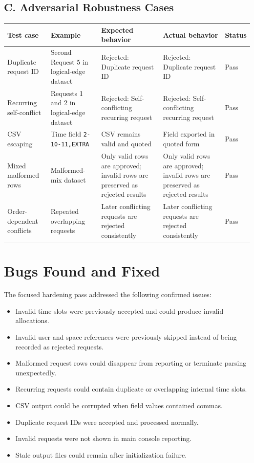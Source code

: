\documentclass[12pt,a4paper]{article}
\begin{document}
\subsection*{C. Adversarial Robustness Cases}
\begin{center}
\footnotesize
\begin{tabularx}{\textwidth}{@{} p{3.0cm} p{3.5cm} X X p{1.1cm} @{}}
\toprule
\textbf{Test case} & \textbf{Example} & \textbf{Expected behavior} & \textbf{Actual behavior} & \textbf{Status} \\
\midrule
Duplicate request ID & Second Request 5 in logical-edge dataset & Rejected: Duplicate request ID & Rejected: Duplicate request ID & Pass \\
Recurring self-conflict & Requests 1 and 2 in logical-edge dataset & Rejected: Self-conflicting recurring request & Rejected: Self-conflicting recurring request & Pass \\
CSV escaping & Time field \texttt{2-10-11,EXTRA} & CSV remains valid and quoted & Field exported in quoted form & Pass \\
Mixed malformed rows & Malformed-mix dataset & Only valid rows are approved; invalid rows are preserved as rejected results & Only valid rows are approved; invalid rows are preserved as rejected results & Pass \\
Order-dependent conflicts & Repeated overlapping requests & Later conflicting requests are rejected consistently & Later conflicting requests are rejected consistently & Pass \\
\bottomrule
\end{tabularx}
\end{center}

\section{Bugs Found and Fixed}
The focused hardening pass addressed the following confirmed issues:
\begin{itemize}
    \item Invalid time slots were previously accepted and could produce invalid allocations.
    \item Invalid user and space references were previously skipped instead of being recorded as rejected requests.
    \item Malformed request rows could disappear from reporting or terminate parsing unexpectedly.
    \item Recurring requests could contain duplicate or overlapping internal time slots.
    \item CSV output could be corrupted when field values contained commas.
    \item Duplicate request IDs were accepted and processed normally.
    \item Invalid requests were not shown in main console reporting.
    \item Stale output files could remain after initialization failure.
\end{itemize}
\end{document}
